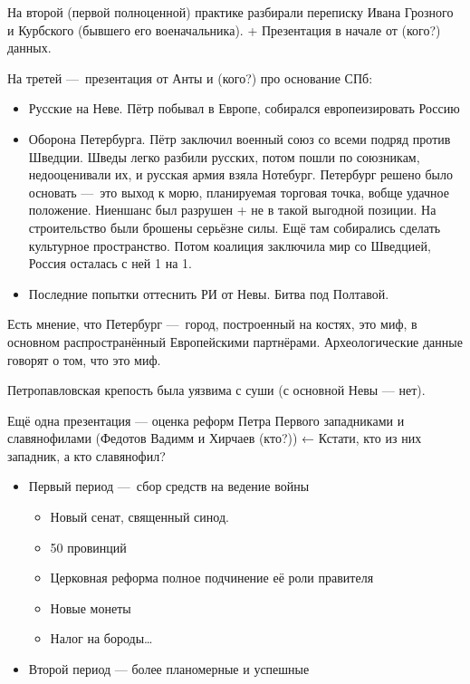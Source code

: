 \documentclass[12pt, a4paper]{article}
\begin{document}
    На второй (первой полноценной) практике разбирали переписку Ивана Грозного и Курбского (бывшего его военачальника).
    + Презентация в начале от (кого?) данных.

    На третей — презентация от Анты и (кого?) про основание СПб:
    
    \begin{itemize}
        \item Русские на Неве. Пётр побывал в Европе, собирался европеизировать Россию
        \item Оборона Петербурга. Пётр заключил военный союз со всеми подряд против Шведции. 
        Шведы легко разбили русских, потом пошли по союзникам, недооценивали их, и русская армия взяла Нотебург.
        Петербург решено было основать — это выход к морю, планируемая торговая точка, вобще удачное положение. Ниеншанс был разрушен + не в такой выгодной позиции. 
        На строительство были брошены серьёзне силы. Ещё там собирались сделать культурное пространство.
        Потом коалиция заключила мир со Шведцией, Россия осталась с ней 1 на 1.
        \item Последние попытки оттеснить РИ от Невы. Битва под Полтавой.
    \end{itemize}

    Есть мнение, что Петербург — город, построенный на костях, это миф, 
    в основном распространённый Европейскими партнёрами. 
    Археологические данные говорят о том, что это миф.

    Петропавловская крепость была уязвима с суши (с основной Невы — нет).

    \ornamentbreak

    Ещё одна презентация — оценка реформ Петра Первого западниками и славянофилами (Федотов Вадимм и Хирчаев (кто?)) ← Кстати, кто из них западник, а кто славянофил?

    \begin{itemize}
        \item Первый период — сбор средств на ведение войны
        \begin{itemize}
            \item Новый сенат, священный синод.
            \item 50 провинций
            \item Церковная реформа полное подчинение её роли правителя
            \item Новые монеты
            \item Налог на бороды…
        \end{itemize}
        \item Второй период — более планомерные и успешные
    \end{itemize}
\end{document}
